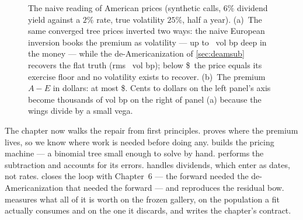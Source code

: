 \begin{figure}[htbp]
\centering
{}
\caption{The naive reading of American prices (synthetic calls, $6\%$
dividend yield against a $2\%$ rate, true volatility $25\%$, half a
year).  (a)~The same converged tree prices inverted two ways: the naive
European inversion books the premium as volatility --- up to
\MacDeamWedgeMaxBiasBp\ vol bp deep in the money --- while the
de-Americanization of \cref{sec:deamsub} recovers the flat truth (rms
\MacDeamWedgeRootRmsBp\ vol bp); below \$\MacDeamMapCallBdryPct\ the
price equals its exercise floor and no volatility exists to recover.  (b)~The premium
$A-E$ in dollars: at most \$\MacDeamWedgeMaxPremiumDollars.  Cents to
dollars on the left panel's axis become thousands of vol bp on the
right of panel (a) because the wings divide by a small vega.}
\label{fig:deamwedge}
\end{figure}

The chapter now walks the repair from first principles.
 proves where the premium lives, so we know where
work is needed before doing any.   builds the
pricing machine --- a binomial tree small enough to solve by hand.
 performs the subtraction and accounts for its
errors.   handles dividends, which enter as dates,
not rates.   closes the loop with Chapter~6 ---
the forward needed the de-Americanization that needed the forward ---
and reproduces the residual bow.   measures what
all of it is worth on the frozen gallery, on the population a fit
actually consumes and on the one it discards, and writes the
chapter's contract.

